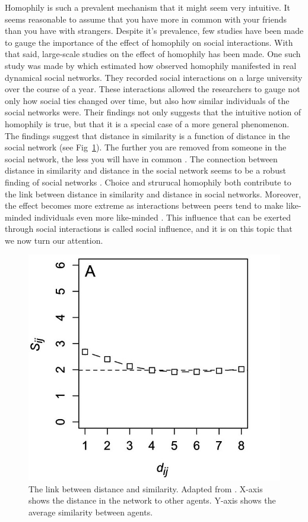 \documentclass{article}
\begin{document}
Homophily is such a prevalent mechanism that it might seem very intuitive. It seems reasonable to assume that you have more in common with your friends than you have with strangers. 
Despite it's prevalence, few studies have been made to gauge the importance of the effect of homophily on social interactions.
With that said, large-scale studies on the effect of homophily has been made. One such study was made by \citeauthor{kossinets_origins_2009} \citeyear{kossinets_origins_2009} which estimated how observed homophily manifested in real dynamical social networks. They recorded social interactions on a large university over the course of a year. These interactions allowed the researchers to gauge not only how social ties changed over time, but also how similar individuals of the social networks were. Their findings not only suggests that the intuitive notion of homophily is true, but that it is a special case of a more general phenomenon. The findings suggest that distance in similarity is a function of distance in the social network (see Fig~\ref{fig:distance_similarity}). The further you are removed from someone in the social network, the less you will have in common \cite{kossinets_origins_2009}. 
The connection between distance in similarity and distance in the social network seems to be a robust finding of social networks \cite{bener_empirical_2016,crandall_feedback_2008}.
Choice and strurucal homophily both contribute to the link between distance in similarity and distance in social networks. Moreover, the effect becomes more extreme as interactions between peers tend to make like-minded individuals even more like-minded \cite{friedkin_social_1990, spears_social_2021}. This influence that can be exerted through social interactions is called social influence, and it is on this topic that we now turn our attention.

\begin{figure}[H]
    \centering
    \includegraphics[width=.8\linewidth]{../plots/references/kossinets_watts_distance.jpeg}
  \caption{The link between distance and similarity. Adapted from \protect\citeauthor{kossinets_origins_2009} \protect\citeyear{kossinets_origins_2009}. X-axis shows the distance in the network to other agents. Y-axis shows the average similarity between agents.}
  \label{fig:distance_similarity}
\end{figure}
\end{document}
